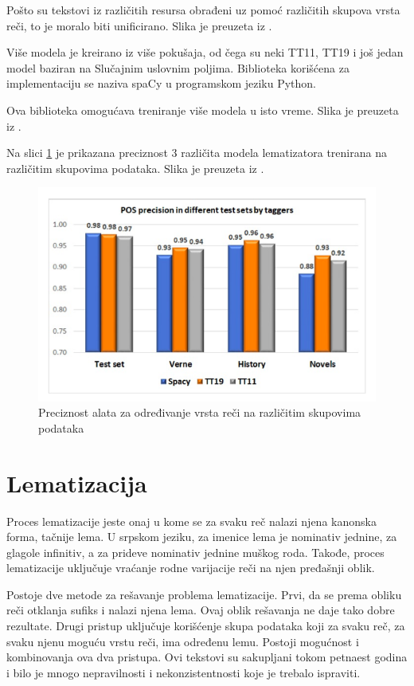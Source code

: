 \documentclass[12pt,oneside]{memoir}
\begin{document}
Pošto su tekstovi iz različitih resursa obrađeni uz pomoć različitih skupova vrsta reči, to je moralo biti unificirano. Slika je preuzeta iz \cite{tagger}.

Više modela je kreirano iz više pokušaja, od čega su neki TT11, TT19 i još jedan model baziran na Slučajnim uslovnim poljima. Biblioteka korišćena za implementaciju se naziva spaCy u programskom jeziku Python.

Ova biblioteka omogućava treniranje više modela u isto vreme. Slika je preuzeta iz \cite{tagger}.

Na slici \ref{img:pos_tagger} je prikazana preciznost 3 različita modela lematizatora trenirana na različitim skupovima podataka. Slika je preuzeta iz \cite{tagger}.

\begin{figure}[h!]
\centering
\includegraphics[width=.7\textwidth]{images/pos_tagger.png}
\caption{Preciznost alata za određivanje vrsta reči na različitim skupovima podataka}
\label{img:pos_tagger}
\end{figure}

\section{Lematizacija}

Proces lematizacije jeste onaj u kome se za svaku reč nalazi njena kanonska forma, tačnije lema. U srpskom jeziku, za imenice lema je nominativ jednine,  za glagole infinitiv, a za prideve nominativ jednine muškog roda. Takođe, proces lematizacije uključuje vraćanje rodne varijacije reči na njen pređašnji oblik.

Postoje dve metode za rešavanje problema lematizacije. Prvi, da se prema obliku reči otklanja sufiks i nalazi njena lema. Ovaj oblik rešavanja ne daje tako dobre rezultate. Drugi pristup uključuje korišćenje skupa podataka koji za svaku reč, za svaku njenu moguću vrstu reči, ima određenu lemu. Postoji mogućnost i kombinovanja ova dva pristupa. Ovi tekstovi su sakupljani tokom petnaest godina i bilo je mnogo nepravilnosti i nekonzistentnosti koje je trebalo ispraviti.
\end{document}
